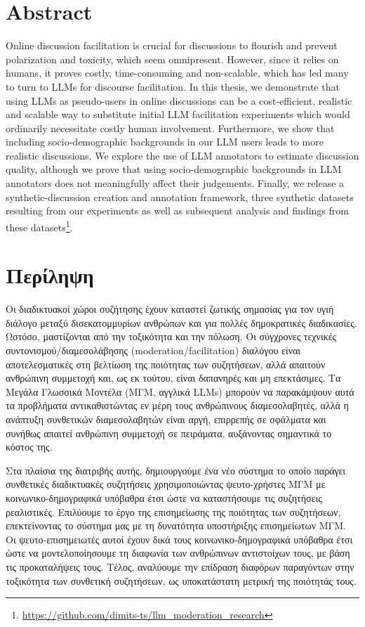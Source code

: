 %

\chapter*{Abstract}
\label{sec:abstract}

Online discussion facilitation is crucial for discussions to flourish and prevent polarization and toxicity, which seem omnipresent. However, since it relies on humans, it proves costly, time-consuming and non-scalable, which has led many to turn to LLMs for discourse facilitation. In this thesis, we demonstrate that using LLMs as pseudo-users in online discussions can be a cost-efficient, realistic and scalable way to substitute initial LLM facilitation experiments which would ordinarily necessitate costly human involvement. Furthermore, we show that including socio-demographic backgrounds in our LLM users leads to more realistic discussions. We explore the use of LLM annotators to estimate discussion quality, although we prove that using socio-demographic backgrounds in LLM annotators does not meaningfully affect their judgements. Finally, we release a synthetic-discussion creation and annotation framework, three synthetic datasets resulting from our experiments as well as subsequent analysis and findings from these datasets\footnote{\url{https://github.com/dimits-ts/llm_moderation_research}}.

\chapter*{Περίληψη}
\label{sec:abstract_greek}


Οι διαδικτυακοί χώροι συζήτησης έχουν καταστεί ζωτικής σημασίας για τον υγιή διάλογο μεταξύ δισεκατομμυρίων ανθρώπων και για πολλές δημοκρατικές διαδικασίες. Ωστόσο, μαστίζονται από την τοξικότητα και την πόλωση. Οι σύγχρονες τεχνικές συντονισμού/διαμεσολάβησης (moderation/facilitation) διαλόγου είναι αποτελεσματικές στη βελτίωση της ποιότητας των συζητήσεων, αλλά απαιτούν ανθρώπινη συμμετοχή και, ως εκ τούτου, είναι δαπανηρές και μη επεκτάσιμες. Τα Μεγάλα Γλωσσικά Μοντέλα (ΜΓΜ, αγγλικά LLMs) μπορούν να παρακάμψουν αυτά τα προβλήματα αντικαθιστώντας εν μέρη τους ανθρώπινους διαμεσολαβητές, αλλά η ανάπτυξη συνθετικών διαμεσολαβητών είναι αργή, επιρρεπής σε σφάλματα και συνήθως απαιτεί ανθρώπινη συμμετοχή σε πειράματα, αυξάνοντας σημαντικά το κόστος της. 

Στα πλαίσια της διατριβής αυτής, δημιουργούμε ένα νέο σύστημα το οποίο παράγει συνθετικές διαδικτυακές συζητήσεις χρησιμοποιώντας ψευτο-χρήστες ΜΓΜ με κοινωνικο-δημογραφικά υπόβαθρα έτσι ώστε να καταστήσουμε τις συζητήσεις ρεαλιστικές. Επιλύουμε το έργο της επισημείωσης της ποιότητας των συζητήσεων, επεκτείνοντας το σύστημα μας με τη δυνατότητα υποστήριξης επισημείωτων ΜΓΜ. Οι ψευτο-επισημειωτές αυτοί έχουν δικά τους κοινωνικο-δημογραφικά υπόβαθρα έτσι ώστε να μοντελοποίησουμε τη διαφωνία των ανθρώπινων αντιστοίχων τους, με βάση τις προκαταλήψεις τους. Τέλος, αναλύουμε την επίδραση διαφόρων παραγόντων στην τοξικότητα των συνθετική συζητήσεων, ως υποκατάστατη μετρική της ποιότητάς τους. 

